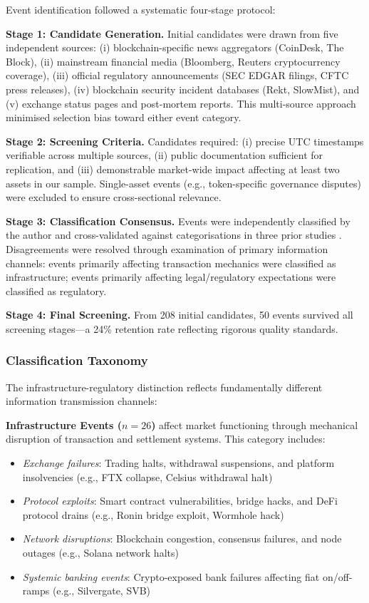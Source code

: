 \documentclass[pdflatex,sn-mathphys-num]{sn-jnl}
\theoremstyle{thmstyleone}
\theoremstyle{thmstyletwo}
\theoremstyle{thmstylethree}
\begin{document}
Event identification followed a systematic four-stage protocol:

\textbf{Stage 1: Candidate Generation.} Initial candidates were drawn from five independent sources: (i) blockchain-specific news aggregators (CoinDesk, The Block), (ii) mainstream financial media (Bloomberg, Reuters cryptocurrency coverage), (iii) official regulatory announcements (SEC EDGAR filings, CFTC press releases), (iv) blockchain security incident databases (Rekt, SlowMist), and (v) exchange status pages and post-mortem reports. This multi-source approach minimised selection bias toward either event category.

\textbf{Stage 2: Screening Criteria.} Candidates required: (i) precise UTC timestamps verifiable across multiple sources, (ii) public documentation sufficient for replication, and (iii) demonstrable market-wide impact affecting at least two assets in our sample. Single-asset events (e.g., token-specific governance disputes) were excluded to ensure cross-sectional relevance.

\textbf{Stage 3: Classification Consensus.} Events were independently classified by the author and cross-validated against categorisations in three prior studies \citep{CorbetEtAl2019, ChenEtAl2023, Grobys2021}. Disagreements were resolved through examination of primary information channels: events primarily affecting transaction mechanics were classified as infrastructure; events primarily affecting legal/regulatory expectations were classified as regulatory.

\textbf{Stage 4: Final Screening.} From 208 initial candidates, 50 events survived all screening stages---a 24\% retention rate reflecting rigorous quality standards.

\subsubsection{Classification Taxonomy}

The infrastructure-regulatory distinction reflects fundamentally different information transmission channels:

\textbf{Infrastructure Events ($n=26$)} affect market functioning through mechanical disruption of transaction and settlement systems. This category includes:
\begin{itemize}[nosep]
\item \textit{Exchange failures}: Trading halts, withdrawal suspensions, and platform insolvencies (e.g., FTX collapse, Celsius withdrawal halt)
\item \textit{Protocol exploits}: Smart contract vulnerabilities, bridge hacks, and DeFi protocol drains (e.g., Ronin bridge exploit, Wormhole hack)
\item \textit{Network disruptions}: Blockchain congestion, consensus failures, and node outages (e.g., Solana network halts)
\item \textit{Systemic banking events}: Crypto-exposed bank failures affecting fiat on/off-ramps (e.g., Silvergate, SVB)
\end{itemize}
\end{document}
